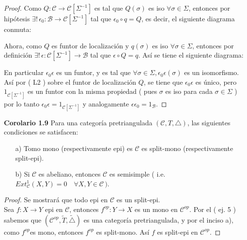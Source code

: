 \documentclass{article}
\begin{document}
\begin{enumerate}
\begin{proof}
Como $Q:\mathscr{C}\to\mathscr{C}[\Sigma^{-1}]$ es tal que $Q(\sigma)$ es iso $\forall \sigma \in \Sigma$, entonces por 
hipótesis $\exists !\,\epsilon_0:\mathscr{B}\to \mathscr{C}[\Sigma^{-1}]$ tal que $\epsilon_0\circ q=Q$, es decir, el siguiente diagrama conmuta:\\
\centerline{
}
Ahora, como $Q$ es funtor de localización y $q(\sigma)$ es iso $\forall \sigma\in \Sigma$, entonces por definición 
$\exists !\,\epsilon:\mathscr{C}[\Sigma^{-1}]\to \mathscr{B}$ tal que $\epsilon\circ Q=q$. Así se tiene el siguiente diagrama:\\
\centerline{
}

En particular $\epsilon_0\epsilon$ es un funtor, y es tal que $\forall \sigma\in \Sigma,$\quad $\epsilon_0\epsilon(\sigma)$ es un isomorfismo. Así por ( L2 )
sobre el funtor de localización $Q$, se tiene que $\epsilon_0\epsilon$ es único, pero $1_{\mathscr{C}[\Sigma^{-1}]}$ es un funtor con la misma
propiedad ( pues $\sigma$ es iso para cada $\sigma \in \Sigma$  ) por lo tanto $\epsilon_0\epsilon=1_{\mathscr{C}[\Sigma^{-1}]}$ y analogamente
$\epsilon\epsilon_0=1_{\mathscr{B}}$.
\end{proof}

\textbf{Corolario 1.9} Para una categoría pretriangulada $(\mathscr{C},T,\triangle)$, las siguientes condiciones se satisfacen:
\begin{itemize}
\item[a)] Tomo mono (respectivamente epi) es $\mathscr{C}$ es split-mono (respectivamente split-epi).
\item[b)] Si $\mathscr{C}$ es abeliano, entonces $\mathscr{C}$ es semisimple ( i.e. \\ $Ext^{1}_\mathscr{C}(X,Y)=0\quad \forall X,Y\in \mathscr{C}\,)$.
\end{itemize}
\begin{proof}
Se mostrará que todo epi en $\mathscr{C}$ es un split-epi.\\

Sea $f:X\to Y$ epi en $\mathscr{C}$, entonces $f^{op}:Y\to X$ es un mono en $\mathscr{C}^{op}$. Por el ( ej. 5 ) sabemos que 
$(\mathscr{C}^{op},\tilde{T},\tilde{\triangle})$ es una categoría pretriangulada, y por el inciso a), como $f^{op}$es mono, entonces $f^{op}$ es 
split-mono. Así $f$ es split-epi en $\mathscr{C}^{op}$.
\end{proof}


\end{enumerate}
\end{document}
